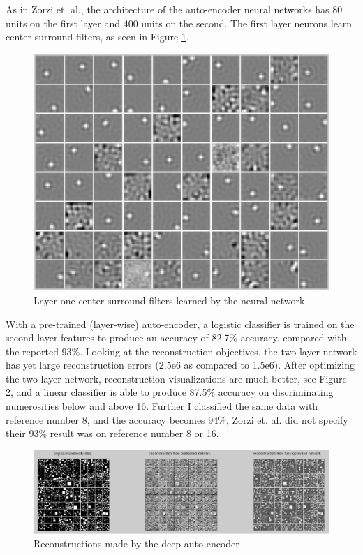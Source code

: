 \documentclass[10pt]{article}
\begin{document}
As in Zorzi et. al., the architecture of the auto-encoder neural networks has 80 units on the first layer and 400 units on the second. The first layer neurons learn center-surround filters, as seen in Figure \ref{fig:center_surround}.

\begin{figure}[tbh]
\centering
\includegraphics[width=0.4\columnwidth]{eps/center_surround}
\caption{Layer one center-surround filters learned by the neural network}
\label{fig:center_surround}
\vspace{-0.3cm}
\end{figure}

With a pre-trained (layer-wise) auto-encoder, a logistic classifier is trained on the second layer features to produce an accuracy of 82.7\% accuracy, compared with the reported 93\%. Looking at the reconstruction objectives, the two-layer network has yet large reconstruction errors (2.5e6 as compared to 1.5e6). After optimizing the two-layer network, reconstruction visualizations are much better, see Figure \ref{fig:reconstructions}, and a linear classifier is able to produce 87.5\% accuracy on discriminating numerosities below and above 16. Further I classified the same data with reference number 8, and the accuracy becomes 94\%, Zorzi et. al. did not specify their 93\% result was on reference number 8 or 16. 

\begin{figure}[tbh]
\centering
\includegraphics[width=1\columnwidth]{eps/reconstructions}
\caption{Reconstructions made by the deep auto-encoder}
\label{fig:reconstructions}
\vspace{-0.3cm}
\end{figure}
\end{document}
